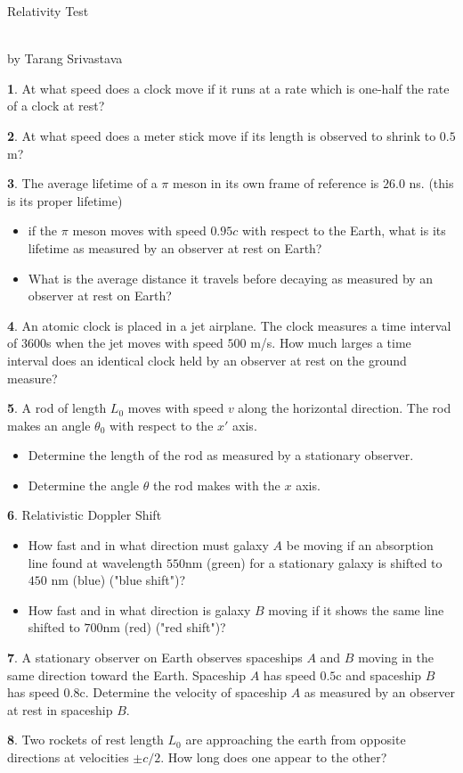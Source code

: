 \documentclass[10pt, twocolumn]{article}
\author{Tarang Srivastava}
\newcommand{\makechaptertitle}[1]{
\begin{center}
	\begin{large}
		#1
	\end{large}
	\begin{small}
		\\by Tarang Srivastava
	\end{small}
\end{center}
}
\theoremstyle{definition}
\newtheorem{q}{}
\begin{document}
		\makechaptertitle{Relativity Test}
		\begin{q}
			At what speed does a clock move if it runs at a rate which is one-half the rate of a clock at rest?
		\end{q}
		\begin{q}
			At what speed does a meter stick move if its length is observed to shrink to $ 0.5 $ m?
		\end{q}
		\begin{q}
			The average lifetime of a $ \pi $ meson in its own frame of reference is $ 26.0 $ ns. (this is its proper lifetime)
			\begin{itemize}
				\item if the $ \pi $ meson moves with speed $ 0.95 c $ with respect to the Earth, what is its lifetime as measured by an observer at rest on Earth?
				\item What is the average distance it travels before decaying as measured by an observer at rest on Earth?
			\end{itemize}
		\end{q}
		\begin{q}
			An atomic clock is placed in a jet airplane. The clock measures a time interval of $ 3600 $s when the jet moves with speed $ 500 $ m/s. How much larges a time interval does an identical clock held by an observer at rest on the ground measure?
		\end{q}
		\begin{q}
			A rod of length $ L_0 $ moves with speed $ v $ along the horizontal direction. The rod makes an angle $ \theta_0 $ with respect to the $ x' $ axis. 
			\begin{itemize}
				\item Determine the length of the rod as measured by a stationary observer.
				\item Determine the angle $ \theta $ the rod makes with the $ x $ axis.
			\end{itemize}
		\end{q}
		\begin{q}
			Relativistic Doppler Shift 
			\begin{itemize}
				\item How fast and in what direction must galaxy $ A $ be moving if an absorption line found at wavelength $ 550 $nm (green) for a stationary galaxy is shifted to $ 450 $ nm (blue) ("blue shift")?
				\item How fast and in what direction is galaxy $ B $ moving if it shows the same line shifted to $ 700 $nm (red) ("red shift")?
			\end{itemize}
		\end{q}
		\begin{q}
			A stationary observer on Earth observes spaceships $ A $ and $ B $ moving in the same direction toward the Earth. Spaceship $ A $ has speed $ 0.5 $c and spaceship $ B $ has speed $ 0.8 $c. Determine the velocity of spaceship $ A $ as measured by an observer at rest in spaceship $ B $.
		\end{q}
		\begin{q}
			Two rockets of rest length $ L_0 $ are approaching the earth from opposite directions at velocities $ \pm c/2 $. How long does one appear to the other?
		\end{q}
\end{document}
